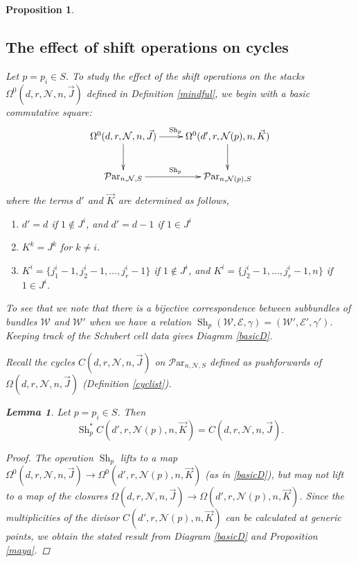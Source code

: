 \documentclass[11pt]{amsart}
\newcommand\op{\operatorname}
\newcommand\Sh{\operatorname{Sh}}
\newcommand\me{\mathcal{E}}
\newcommand\mw{\mathcal{W}}
\newcommand\mn{\mathcal{N}}
\newcommand\Par{\mathcal{P}\text{ar} }
\newtheorem{proposition}[theorem]{Proposition}
\newtheorem{lemma}[theorem]{Lemma}
\numberwithin{theorem}{subsection}
\begin{document}
{\begin{proposition}
\subsection{The effect of shift operations on cycles}
Let $p=p_i\in S$. To study the effect of the shift operations on the stacks $\Omega^0(d,r,\mn,n,\vec{J})$ defined in Definition  \ref{mindful}, we begin with a basic commutative square:
\begin{equation}\label{basicD}
\xymatrix{
 \Omega^0(d,r,\mn,n,\vec{J})\ar[d]\ar[r]^{\operatorname{Sh}_p}  & \Omega^0(d',r,\mn(p),n,\vec{K})\ar[d]\\
\Par_{n,\mn,S}\ar[r]^{\operatorname{Sh}_p}  & \Par_{n,\mn(p),S}
}
\end{equation}
where the terms $d'$ and $\vec{K}$ are determined as follows,
 \begin{enumerate}
 \item $d'=d$ if $1\notin J^i$, and $d'=d-1$ if $1\in J^i$
 \item $K^k=J^k$ for $k\neq i$.
 \item $K^i =\{j^i_1-1,j^i_2-1,\dots, j^i_r-1\}$ if $1\notin J^i$, and $K^i =\{j^i_2-1,\dots, j^i_r-1,n\}$ if $1\in J^i$.
 \end{enumerate}

To see that we note that there is a bijective correspondence between subbundles of bundles $\mw$ and $\mw'$ when we have a relation $\Sh_p(\mw,\me,\gamma)=(\mw',\me',\gamma')$. Keeping track of the Schubert cell data gives Diagram \eqref{basicD}.

Recall the cycles $C(d,r,\mn,n,\vec{J})$ on $\Par_{n,\mn,S}$ defined as pushforwards of $\Omega(d,r,\mn,n,\vec{J})$ (Definition  \ref{cyclist}).
 \begin{lemma}\label{newS} Let $p=p_i\in S$. Then
 $$\operatorname{Sh}_{p}^*C(d',r,\mn(p),n,\vec{K})=C(d,r,\mn,n,\vec{J}).$$
 \end{lemma}
\begin{proof}
 The operation $\op{Sh}_p$  lifts to a map  $\Omega^0(d,r,\mn,n,\vec{J})\to \Omega^0(d',r,\mn(p),n,\vec{K})$ (as in \eqref{basicD}), but  may not lift to a map of the closures $\Omega(d,r,\mn,n,\vec{J})\to \Omega(d',r,\mn(p),n,\vec{K})$. Since the multiplicities of the divisor
$C(d',r,\mn(p),n,\vec{K})$ can be calculated at generic points, we obtain the stated result from Diagram \eqref{basicD} and Proposition \ref{maya}.
\end{proof}

\end{proposition}}
\end{document}
